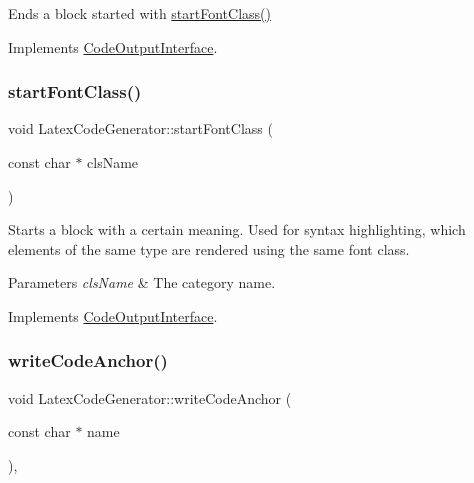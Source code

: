 Ends a block started with \mbox{\hyperlink{class_latex_code_generator_a46db28807c10d4fe78941dd0d907b73a}{start\+Font\+Class()}} 

Implements \mbox{\hyperlink{class_code_output_interface_a2b8ac05a391dae36793aa3aa8714a0f6}{Code\+Output\+Interface}}.

\mbox{\label{class_latex_code_generator_a46db28807c10d4fe78941dd0d907b73a}} 
\subsubsection{\texorpdfstring{startFontClass()}{startFontClass()}}
{\footnotesize\ttfamily void Latex\+Code\+Generator\+::start\+Font\+Class (\begin{DoxyParamCaption}\item[{const char $\ast$}]{cls\+Name }\end{DoxyParamCaption})\hspace{0.3cm}{\ttfamily [virtual]}}

Starts a block with a certain meaning. Used for syntax highlighting, which elements of the same type are rendered using the same \textquotesingle{}font class\textquotesingle{}. 
\begin{DoxyParams}{Parameters}
{\em cls\+Name} & The category name. \\
\hline
\end{DoxyParams}


Implements \mbox{\hyperlink{class_code_output_interface_ac90f75968cdcf127e0b02938bdb49d87}{Code\+Output\+Interface}}.

\mbox{\label{class_latex_code_generator_a272d84903dad24a0f8bae1c8d4c8e239}} 
\subsubsection{\texorpdfstring{writeCodeAnchor()}{writeCodeAnchor()}}
{\footnotesize\ttfamily void Latex\+Code\+Generator\+::write\+Code\+Anchor (\begin{DoxyParamCaption}\item[{const char $\ast$}]{name }\end{DoxyParamCaption})\hspace{0.3cm}{\ttfamily [inline]}, {\ttfamily [virtual]}}


